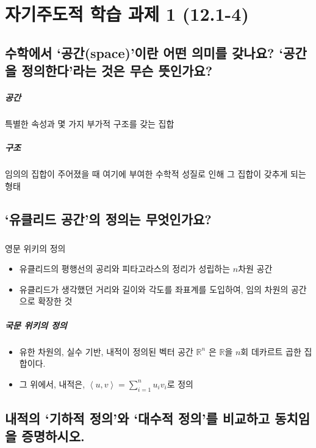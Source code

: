 
\chapter{자기주도적 학습 과제 1 (12.1-4)}

\section{수학에서 ‘공간(space)’이란 어떤 의미를 갖나요? `공간을 정의한다’라는 것은 무슨 뜻인가요?}
\paragraph{공간}
	특별한 속성과 몇 가지 부가적 구조를 갖는 집합
\paragraph{구조}
	임의의 집합이 주어졌을 때 여기에 부여한 수학적 성질로 인해 그 집합이 갖추게 되는 형태

\section{‘유클리드 공간’의 정의는 무엇인가요?}

\paragraph{}{영문 위키의 정의}
\begin{itemize}
    \item 유클리드의 평행선의 공리와 피타고라스의 정리가 성립하는 $n$차원 공간
    \item 유클리드가 생각했던 거리와 길이와 각도를 좌표계를 도입하여, 임의 차원의 공간으로 확장한 것
\end{itemize}

\paragraph{국문 위키의 정의}
\begin{itemize}
    \item 유한 차원의, 실수 기반, 내적이 정의된 벡터 공간 $\mathbb{R}^n$ 은 $\mathbb{R}$을 $n$회 데카르트 곱한 집합이다.
    \item 그 위에서, 내적은, $\left\langle u,v \right\rangle=\sum_{i=1}^{n}{u_iv_i}$로 정의
\end{itemize}
	
\section{내적의 `기하적 정의'와 `대수적 정의'를 비교하고 동치임을 증명하시오.}


